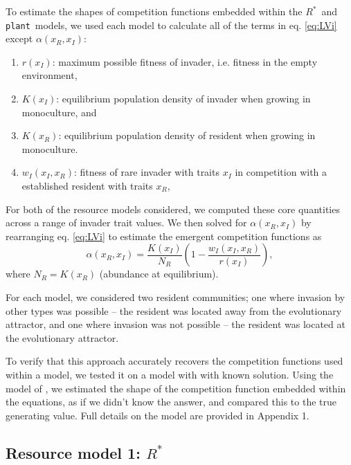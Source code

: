 \documentclass[a4paper,11pt]{article}
\newcommand{\Rstar}{\ensuremath{R^*}}
\newcommand{\plant}{{\tt plant}}
\begin{document}
To estimate the shapes of competition functions embedded within the \Rstar\ and \plant\ models, we used each model to calculate all of the terms in eq. \ref{eq:LVi} except $\alpha(x_R, x_I)$:
\begin{enumerate}
\item $r(x_I)$: maximum possible fitness of invader, i.e. fitness in the empty environment,
\item $K(x_I)$: equilibrium population density of invader when growing in monoculture, and
\item $K(x_R)$: equilibrium population density of resident when growing in monoculture.
\item $w_I(x_I, x_R)$: fitness of rare invader with traits $x_I$ in competition with a established resident with traits $x_R$,
\end{enumerate}

For both of the resource models considered, we computed these core quantities across a range of invader trait values. We then solved for $\alpha(x_R, x_I)$ by rearranging eq. \ref{eq:LVi} to estimate the emergent competition functions as
\begin{equation} \label{eq:alpha}
  \alpha(x_R, x_I) = \frac{K(x_I)}{N_R} \left(1 - \frac{w_I(x_I, x_R)}{r(x_I)}\right),
\end{equation}
where $N_R = K(x_R)$ (abundance at equilibrium). 


For each model, we considered two resident communities; one where invasion by other types was possible -- the resident was located away from the evolutionary attractor, and one where invasion was not possible -- the resident was located at the evolutionary attractor.

To verify that this approach accurately recovers the competition functions used within a model, we tested it on a model with with known solution. Using the model of \citet{Dieckmann-1999}, we estimated the shape of the competition function embedded within the equations, as if we didn't know the answer, and compared this to the true generating value. Full details on the model are provided in Appendix 1.


\subsection{Resource model 1: \Rstar }
\end{document}

